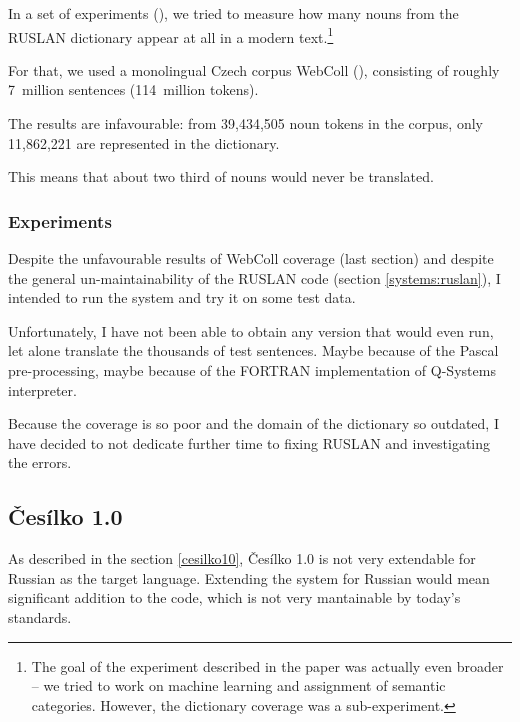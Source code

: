 In a set of experiments (\cite{florida}), we tried to measure how many nouns from the RUSLAN dictionary appear at all in a modern text.\footnote{The goal of the experiment described in the paper was actually even broader -- we tried to work on machine learning and assignment of semantic categories. However, the dictionary coverage was a sub-experiment.} 

For that, we used a monolingual Czech corpus WebColl (\cite{webcoll}), consisting of roughly 7~million sentences (114~million tokens).


The results are infavourable: from 39,434,505 noun tokens in the corpus, only 11,862,221 are represented in the dictionary.

This means that about two third of nouns would never be translated.

\subsubsection{Experiments}

Despite the unfavourable results of WebColl coverage (last section) and despite the  general un-maintainability of the RUSLAN code (section \ref{systems:ruslan}), I intended to run the system and try it on some test data.

Unfortunately, I have not been able to obtain any version that would even run, let alone translate the thousands of test sentences. Maybe because of the Pascal pre-processing, maybe because of the FORTRAN implementation of Q-Systems interpreter.

Because the coverage is so poor and the domain of the dictionary so outdated, I have decided to not dedicate further time to fixing RUSLAN and investigating the errors.

\subsection{Česílko 1.0}
\label{experiments:cesilko10}

As described in the section \ref{cesilko10}, Česílko 1.0 is not very extendable for Russian as the target language. Extending the system for Russian would mean significant addition to the code, which is not very mantainable by today's standards. 


